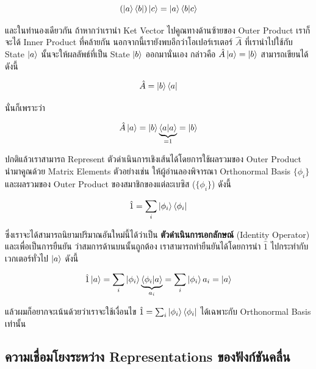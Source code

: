 \begin{equation}
    (\ket{a}\bra{b}) \ket{c}
    =
    \ket{a} \braket{b}{c}
\end{equation}

\noindent และในทำนองเดียวกัน ถ้าหากว่าเรานำ Ket Vector ไปคูณทางด้านซ้ายของ Outer Product เราก็จะได้ Inner Product ที่คล้ายกัน
นอกจากนี้เรายังพบอีกว่าโอเปอร์เรเตอร์ $\hat{A}$ ที่เรานำไปใช้กับ State $\ket{a}$ นั้นจะให้ผลลัพธ์ที่เป็น State $\ket{b}$ ออกมานั่นเอง
กล่าวคือ $\hat{A}\ket{a} = \ket{b}$ สามารถเขียนได้ดังนี้

\begin{equation}
    \hat{A} = \ket{b}\bra{a}
\end{equation}

\noindent นั่นก็เพราะว่า

\begin{equation}
    \hat{A} \ket{a}
    =
    \ket{b} \underbrace{\braket{a}{a}}_{=1}
    =
    \ket{b}
\end{equation}

ปกติแล้วเราสามารถ Represent ตัวดำเนินการเชิงเส้นได้โดยการใช้ผลรวมของ Outer Product นำมาคูณด้วย Matrix Elements ตัวอย่างเช่น
ให้ผู้อ่านลองพิจารณา Orthonormal Basis $\{ \phi_i \}$ และผลรวมของ Outer Product ของสมาชิกของแต่ละเบซิส ($\{ \phi_i \}$)
ดังนี้

\begin{equation}
    \hat{1}
    =
    \sum_i \ket{\phi_i}\bra{\phi_i}
\end{equation}

\noindent ซึ่งเราจะได้สามารถนิยามปริมาณอันใหม่นี้ได้ว่าเป็น \textbf{ตัวดำเนินการเอกลักษณ์} (Identity Operator) และเพื่อเป็นการยืนยัน%
ว่าสมการด้านบนนั้นถูกต้อง เราสามารถทำยืนยันได้โดยการนำ $\hat{1}$ ไปกระทำกับเวกเตอร์ทั่วไป $\ket{a}$ ดังนี้

\begin{equation}
    \hat{1}\ket{a}
    =
    \sum_i \ket{\phi_i}\underbrace{\braket{\phi_i}{a}}_{a_i}
    =
    \sum_i \ket{\phi_i} a_i
    =
    \ket{a}
\end{equation}

\noindent แล้วผมก็อยากจะเน้นด้วยว่าเราจะใช้เงื่อนไข $\hat{1} = \sum_i \ket{\phi_i}\bra{\phi_i}$ ได้เฉพาะกับ Orthonormal
Basis เท่านั้น

\subsection{ความเชื่อมโยงระหว่าง Representations ของฟังก์ชันคลื่น}


